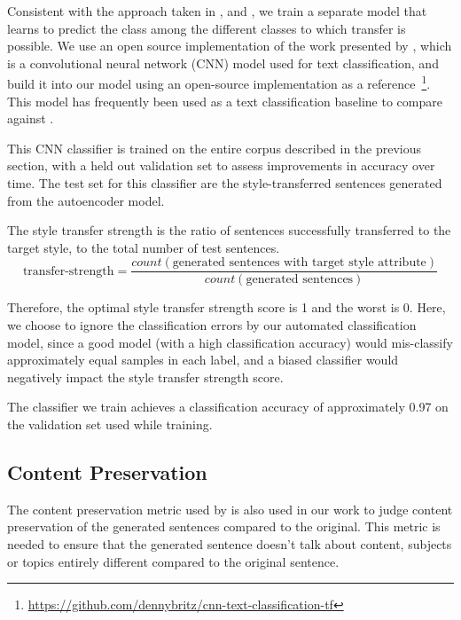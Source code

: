 Consistent with the approach taken in \cite{hu2017toward}, \cite{shen2017style} and \cite{fu2017style}, we train a separate model that learns to predict the class among the different classes to which transfer is possible. We use an open source implementation of the work presented by \cite{kim2014convolutional}, which is a convolutional neural network (CNN) model used for text classification, and build it into our model using an open-source implementation as a reference~\footnote{\url{https://github.com/dennybritz/cnn-text-classification-tf}}. This model has frequently been used as a text classification baseline to compare against \citep{tai2015improved} \citep{kiros2015skip} \citep{zhang2015character}.

This CNN classifier is trained on the entire corpus described in the previous section, with a held out validation set to assess improvements in accuracy over time. The test set for this classifier are the style-transferred sentences generated from the autoencoder model.

The style transfer strength is the ratio of sentences successfully transferred to the target style, to the total number of test sentences.
\begin{equation*}
	\text{transfer-strength} = \frac{count(\text{generated sentences with target style attribute})}{count(\text{generated sentences})}
\end{equation*}

Therefore, the optimal style transfer strength score is 1 and the worst is 0. Here, we choose to ignore the classification errors by our automated classification model, since a good model (with a high classification accuracy) would mis-classify approximately equal samples in each label, and a biased classifier would negatively impact the style transfer strength score.

The classifier we train achieves a classification accuracy of approximately 0.97 on the validation set used while training.

\subsection{Content Preservation} \label{ssec:content-preservation-metric}

The content preservation metric used by \cite{fu2017style} is also used in our work to judge content preservation of the generated sentences compared to the original. This metric is needed to ensure that the generated sentence doesn't talk about content, subjects or topics entirely different compared to the original sentence.

